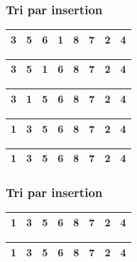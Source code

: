 \begin{frame}
\frametitle{Tri par insertion}
\begin{table}
\begin{tabular}{| c | c | c | c | c | c | c | c |}
\hline
\cellcolor{blue!25}3 & \cellcolor{blue!25}5 & \cellcolor{blue!25}6 & \cellcolor{red!25}1 & 8 & 7 & 2 & 4 \\ 
\hline
\end{tabular}
\end{table}
\begin{table}
\begin{tabular}{| c | c | c | c | c | c | c | c |}
\hline
\cellcolor{blue!25}3 & \cellcolor{blue!25}5 & \cellcolor{red!25}1 & \cellcolor{blue!25}6 & 8 & 7 & 2 & 4 \\ 
\hline
\end{tabular}
\end{table}
\begin{table}
\begin{tabular}{| c | c | c | c | c | c | c | c |}
\hline
\cellcolor{blue!25}3 & \cellcolor{red!25}1 & \cellcolor{blue!25}5 & \cellcolor{blue!25}6 & 8 & 7 & 2 & 4 \\ 
\hline
\end{tabular}
\end{table}
\begin{table}
\begin{tabular}{| c | c | c | c | c | c | c | c |}
\hline
\cellcolor{red!25}1 & \cellcolor{blue!25}3 & \cellcolor{blue!25}5 & \cellcolor{blue!25}6 & 8 & 7 & 2 & 4 \\ 
\hline
\end{tabular}
\end{table}
\begin{table}
\begin{tabular}{| c | c | c | c | c | c | c | c |}
\hline
\cellcolor{blue!25}1 & \cellcolor{blue!25}3 & \cellcolor{blue!25}5 & \cellcolor{blue!25}6 & 8 & 7 & 2 & 4 \\ 
\hline
\end{tabular}
\end{table}
\end{frame}

\begin{frame}
\frametitle{Tri par insertion}
\begin{table}
\begin{tabular}{| c | c | c | c | c | c | c | c |}
\hline
\cellcolor{blue!25}1 & \cellcolor{blue!25}3 & \cellcolor{blue!25}5 & \cellcolor{blue!25}6 & \cellcolor{red!25}8 & 7 & 2 & 4 \\ 
\hline
\end{tabular}
\end{table}
\begin{table}
\begin{tabular}{| c | c | c | c | c | c | c | c |}
\hline
\cellcolor{blue!25}1 & \cellcolor{blue!25}3 & \cellcolor{blue!25}5 & \cellcolor{blue!25}6 & \cellcolor{blue!25}8 & 7 & 2 & 4 \\ 
\hline
\end{tabular}
\end{table}
\end{frame}

